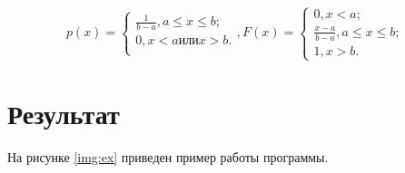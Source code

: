 \documentclass[a4paper, 14pt, unknownkeysallowed]{extreport}
\begin{document}
\begin{equation}
	p(x) = \begin{cases}
		\frac{1}{b - a}, a\leq x\leq b;\\
		0, x < a или x > b.\\
	\end{cases},   
	F(x) =  \begin{cases}
		0, x < a;\\
		\frac{x-a}{b-a}, a\leq x\leq b;\\
		1, x > b.
	\end{cases}
\end{equation}

\chapter{Результат}
На рисунке \ref{img:ex} приведен пример работы программы.
\end{document}
